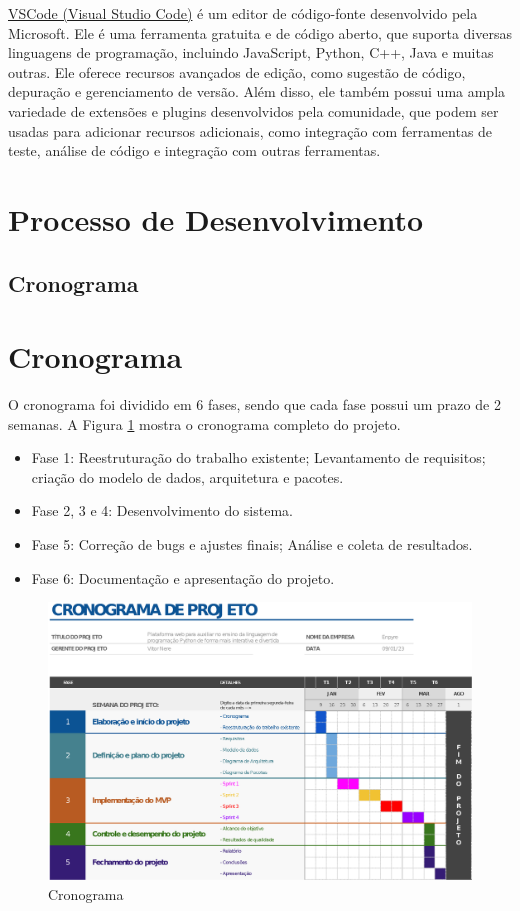 \href{https://code.visualstudio.com/}{VSCode (Visual Studio Code)} é um editor de código-fonte desenvolvido pela Microsoft. Ele é uma ferramenta gratuita e de código aberto, que suporta diversas linguagens de programação, incluindo JavaScript, Python, C++, Java e muitas outras. Ele oferece recursos avançados de edição, como sugestão de código, depuração e gerenciamento de versão. Além disso, ele também possui uma ampla variedade de extensões e plugins desenvolvidos pela comunidade, que podem ser usadas para adicionar recursos adicionais, como integração com ferramentas de teste, análise de código e integração com outras ferramentas.

\section{Processo de Desenvolvimento}

\subsection{Cronograma}

\section{Cronograma}

O cronograma foi dividido em 6 fases, sendo que cada fase possui um prazo de 2 semanas. A Figura \ref{fig:cronograma} mostra o cronograma completo do projeto.

\begin{itemize}
    \item Fase 1: Reestruturação do trabalho existente; Levantamento de requisitos; criação do modelo de dados, arquitetura e pacotes.
    \item Fase 2, 3 e 4: Desenvolvimento do sistema.
    \item Fase 5: Correção de bugs e ajustes finais; Análise e coleta de resultados.
    \item Fase 6: Documentação e apresentação do projeto.
\end{itemize}

\begin{figure}[H]
    \centering
    \includegraphics[width=1.1\textwidth]{figuras/cronograma.eps}
    \caption{Cronograma}
    \label{fig:cronograma}
\end{figure}

